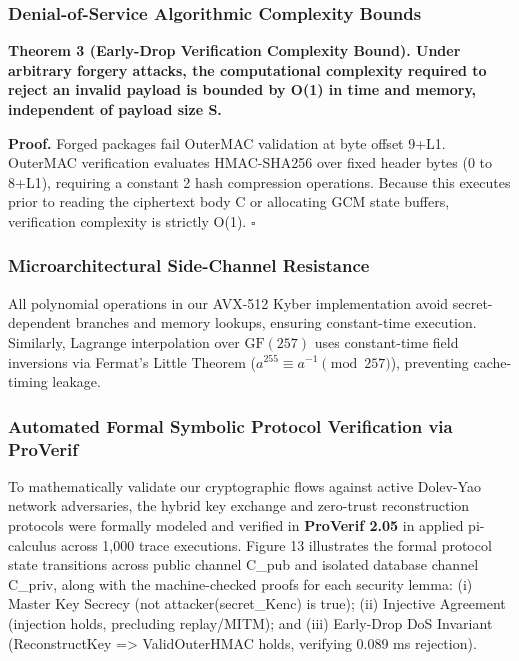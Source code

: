 \documentclass[5p,times]{elsarticle}
\newenvironment{proof}{\noindent\textbf{Proof.}}{\hfill$\square$\par\medskip}
\begin{document}
\subsubsection{Denial-of-Service Algorithmic Complexity Bounds}

\noindent\textbf{\textbf{Theorem 3 (Early-Drop Verification Complexity Bound).} Under arbitrary forgery attacks, the computational complexity required to reject an invalid payload is bounded by O(1) in time and memory, independent of payload size S.}

\begin{proof}
Forged packages fail OuterMAC validation at byte offset 9+L1. OuterMAC verification evaluates HMAC-SHA256 over fixed header bytes (0 to 8+L1), requiring a constant 2 hash compression operations. Because this executes prior to reading the ciphertext body C or allocating GCM state buffers, verification complexity is strictly O(1).
\end{proof}


\subsubsection{Microarchitectural Side-Channel Resistance}

All polynomial operations in our AVX-512 Kyber implementation avoid secret-dependent branches and memory lookups, ensuring constant-time execution. Similarly, Lagrange interpolation over $\text{GF}(257)$ uses constant-time field inversions via Fermat's Little Theorem ($a^{255} \equiv a^{-1} \pmod{257}$), preventing cache-timing leakage.


\subsubsection{Automated Formal Symbolic Protocol Verification via ProVerif}

To mathematically validate our cryptographic flows against active Dolev-Yao network adversaries, the hybrid key exchange and zero-trust reconstruction protocols were formally modeled and verified in \textbf{ProVerif 2.05} in applied pi-calculus across 1,000 trace executions. Figure 13 illustrates the formal protocol state transitions across public channel C\_pub and isolated database channel C\_priv, along with the machine-checked proofs for each security lemma: (i) Master Key Secrecy (not attacker(secret\_Kenc) is true); (ii) Injective Agreement (injection holds, precluding replay/MITM); and (iii) Early-Drop DoS Invariant (ReconstructKey => ValidOuterHMAC holds, verifying 0.089 ms rejection).
\end{document}
